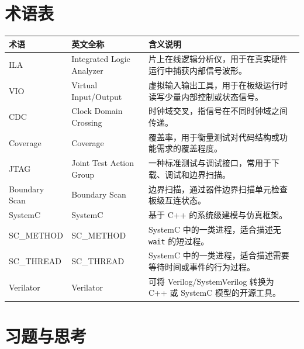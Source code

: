 \section{术语表}\label{ux672fux8bedux8868}

\begin{longtable}[]{@{}
  >{\raggedright\arraybackslash}p{}
  >{\raggedright\arraybackslash}p{}
  >{\raggedright\arraybackslash}p{}@{}}
\toprule\noalign{}
\begin{minipage}[b]{\linewidth}\raggedright
术语
\end{minipage} & \begin{minipage}[b]{\linewidth}\raggedright
英文全称
\end{minipage} & \begin{minipage}[b]{\linewidth}\raggedright
含义说明
\end{minipage} \\
\midrule\noalign{}
\endhead
\bottomrule\noalign{}
\endlastfoot
ILA & Integrated Logic Analyzer &
片上在线逻辑分析仪，用于在真实硬件运行中捕获内部信号波形。 \\
VIO & Virtual Input/Output &
虚拟输入输出工具，用于在板级运行时读写少量内部控制或状态信号。 \\
CDC & Clock Domain Crossing &
时钟域交叉，指信号在不同时钟域之间传递。 \\
Coverage & Coverage &
覆盖率，用于衡量测试对代码结构或功能需求的覆盖程度。 \\
JTAG & Joint Test Action Group &
一种标准测试与调试接口，常用于下载、调试和边界扫描。 \\
Boundary Scan & Boundary Scan &
边界扫描，通过器件边界扫描单元检查板级互连状态。 \\
SystemC & SystemC & 基于 C++ 的系统级建模与仿真框架。 \\
SC\_METHOD & SC\_METHOD & SystemC 中的一类进程，适合描述无
\passthrough{\lstinline!wait!} 的短过程。 \\
SC\_THREAD & SC\_THREAD & SystemC
中的一类进程，适合描述需要等待时间或事件的行为过程。 \\
Verilator & Verilator & 可将 Verilog/SystemVerilog 转换为 C++ 或 SystemC
模型的开源工具。 \\
\end{longtable}

\section{习题与思考}\label{ux4e60ux9898ux4e0eux601dux8003}

